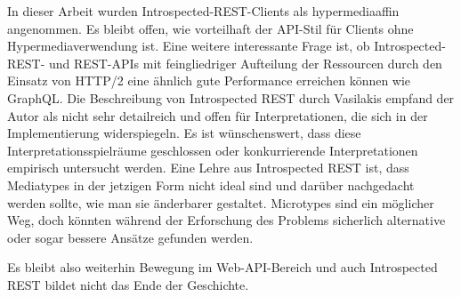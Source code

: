 \para{}In dieser Arbeit wurden Introspected-REST-Clients als hypermediaaffin angenommen. Es bleibt offen, wie vorteilhaft der API-Stil für Clients ohne Hypermediaverwendung ist. Eine weitere interessante Frage ist, ob Introspected-REST- und REST-APIs mit feingliedriger Aufteilung der Ressourcen durch den Einsatz von HTTP/2 eine ähnlich gute Performance erreichen können wie GraphQL. Die Beschreibung von Introspected REST durch Vasilakis empfand der Autor als nicht sehr detailreich und offen für Interpretationen, die sich in der Implementierung widerspiegeln. Es ist wünschenswert, dass diese Interpretationsspielräume geschlossen oder konkurrierende Interpretationen empirisch untersucht werden. Eine Lehre aus Introspected REST ist, dass Mediatypes in der jetzigen Form nicht ideal sind und darüber nachgedacht werden sollte, wie man sie änderbarer gestaltet. Microtypes sind ein möglicher Weg, doch könnten während der Erforschung des Problems sicherlich alternative oder sogar bessere Ansätze gefunden werden.

\para{}Es bleibt also weiterhin Bewegung im Web-API-Bereich und auch Introspected REST bildet nicht das Ende der Geschichte.